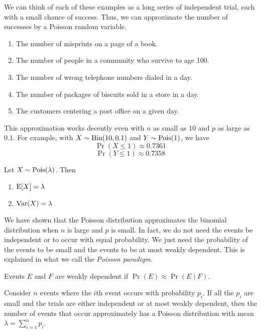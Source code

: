 \documentclass{article}
\begin{document}
\begin{example}
  We can think of each of these examples as a long series of independent trial, each with a small chance of success.
  Thus, we can approximate the number of successes by a Poisson random variable.
  \begin{enumerate}
    \item The number of misprints on a page of a book.
    \item The number of people in a community who survive to age 100.
    \item The number of wrong telephone numbers dialed in a day.
    \item The number of packages of biscuits sold in a store in a day.
    \item The customers centering a post office on a given day.
  \end{enumerate}
\end{example}

\begin{remark}
  This approximation works decently even with $n$ as small as $10$ and $p$ as large as $0.1$.
  For example, with $X \sim \textnormal{Bin}(10, 0.1)$ and $Y \sim \textnormal{Pois}(1)$, we have
  \[
    \Pr(X \leq 1) \approx 0.7361
  \]
  \[
    \Pr(Y \leq 1) \approx 0.7358
  \]
\end{remark}

\begin{theorem}
  Let $X \sim \textnormal{Pois}(\lambda)$.
  Then
  \begin{enumerate}
    \item $\operatorname{E}[X] = \lambda$
    \item $\operatorname{Var}(X) = \lambda$
  \end{enumerate}
\end{theorem}

We have shown that the Poisson distribution approximates the binomial distribution when $n$ is large and $p$ is small.
In fact, we do not need the events be independent or to occur with equal probability.
We just need the probability of the events to be small and the events to be at most weakly dependent.
This is explained in what we call the \emph{Poisson paradigm}.

\begin{definition}
  Events $E$ and $F$ are weakly dependent if $\Pr(E) \approx \Pr(E \mid F)$.
\end{definition}

\begin{theorem}
  Consider $n$ events where the $i$th event occurs with probability $p_i$.
  If all the $p_i$ are small and the trials are either independent or at most weakly dependent, then the number of events that occur approximately has a Poisson distribution with mean $\lambda = \sum_{i = 1}^n p_i$.
\end{theorem}
\end{document}
